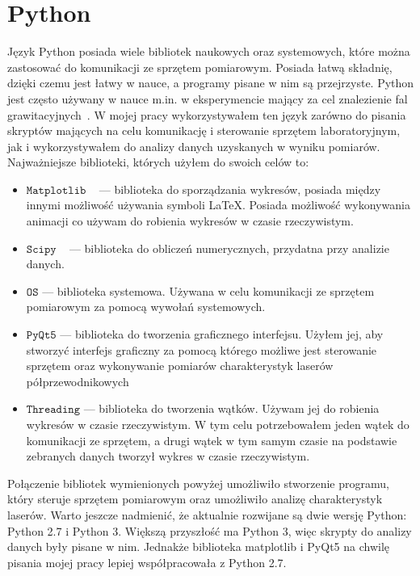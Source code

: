 \section{Python}
Język Python posiada wiele bibliotek naukowych oraz systemowych, które można zastosować do komunikacji ze sprzętem pomiarowym.
Posiada łatwą składnię, dzięki czemu jest łatwy w nauce, a programy pisane w nim są przejrzyste.
Python jest często używany w nauce m.in. w eksperymencie mający za cel znalezienie fal grawitacyjnych~\cite{python}.
W mojej pracy wykorzystywałem ten język zarówno do pisania skryptów mających na celu komunikację i sterowanie sprzętem laboratoryjnym,
jak i wykorzystywałem do analizy danych uzyskanych w wyniku pomiarów.
Najważniejsze biblioteki, których użyłem do swoich celów to:
\begin{itemize}
\item $\mathtt{Matplotlib}$ ~\cite{matplotlib_book} --- biblioteka do sporządzania wykresów, posiada między innymi możliwość używania symboli \LaTeX.
Posiada możliwość wykonywania animacji co używam do robienia wykresów w czasie rzeczywistym.
\item $\mathtt{Scipy}$ ~\cite{SciPy_book} --- biblioteka do obliczeń numerycznych, przydatna przy analizie danych.
\item $\mathtt{OS}$ --- biblioteka systemowa. Używana w celu komunikacji ze sprzętem pomiarowym za pomocą wywołań systemowych.
\item $\mathtt{PyQt5}$ --- biblioteka do tworzenia graficznego interfejsu. Użyłem jej, aby stworzyć interfejs graficzny za pomocą
którego możliwe jest sterowanie sprzętem oraz wykonywanie pomiarów charakterystyk laserów półprzewodnikowych
\item $\mathtt{Threading}$ --- biblioteka do tworzenia wątków. Używam jej do robienia wykresów w czasie rzeczywistym.
W tym celu potrzebowałem jeden wątek do komunikacji ze sprzętem, a drugi wątek w tym samym czasie
na podstawie zebranych danych tworzył wykres w czasie rzeczywistym.
\end{itemize}
Połączenie bibliotek wymienionych powyżej umożliwiło stworzenie programu, który steruje sprzętem pomiarowym oraz
umożliwiło analizę charakterystyk laserów.
Warto jeszcze nadmienić, że aktualnie rozwijane są dwie wersję Python: Python 2.7 i Python 3. Większą przyszłość ma Python 3,
więc skrypty do analizy danych były pisane w nim. Jednakże biblioteka matplotlib i PyQt5 na chwilę pisania mojej
pracy lepiej współpracowała z Python 2.7.
